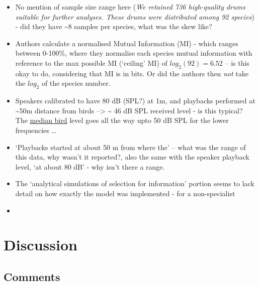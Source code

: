 \documentclass[
]{book}
\providecommand{\tightlist}{%
  \setlength{\itemsep}{0pt}\setlength{\parskip}{0pt}}
\begin{document}
\begin{itemize}
\tightlist
\item
  No mention of sample size range here (\emph{We retained 736 high-quality drums suitable for further analyses. These drums were distributed among 92 species}) - did they have \textasciitilde8 samples per species, what was the skew like?
\item
  Authors calculate a normalised Mutual Information (MI) - which ranges between 0-100\%, where they normalise each species mutual information with reference to the max possible MI (`ceiling' MI) of \(log_{2}(92)=6.52\) -- is this okay to do, considering that MI is in
  bits. Or did the authors then \emph{not} take the \(log_{2}\) of the species number.
\item
  Speakers calibrated to have 80 dB (SPL?) at 1m, and playbacks performed at \textasciitilde50m distance from birds --\textgreater{} \textasciitilde{} 46 dB SPL received level - is this typical? The \href{https://www.researchgate.net/figure/Bird-Hearing-Thresholds-Median-bird-hearing-thresholds-from-49-bird-species-measured_fig5_228381219}{median bird} level goes all the way upto 50 dB SPL for the lower frequencies \ldots{}
\item
  `Playbacks started at about 50 m from where the' -- what was the range of this data, why wasn't it reported?, also the same with the speaker playback level, `at about 80 dB' - why isn't there a range.
\item
  The `analytical simulations of selection for information' portion seems to lack detail on how exactly the model was implemented - for a non-specialist
\item
\end{itemize}

\hypertarget{discussion-11}{%
\section{Discussion}\label{discussion-11}}

\hypertarget{comments-15}{%
\subsection{Comments}\label{comments-15}}
\end{document}
